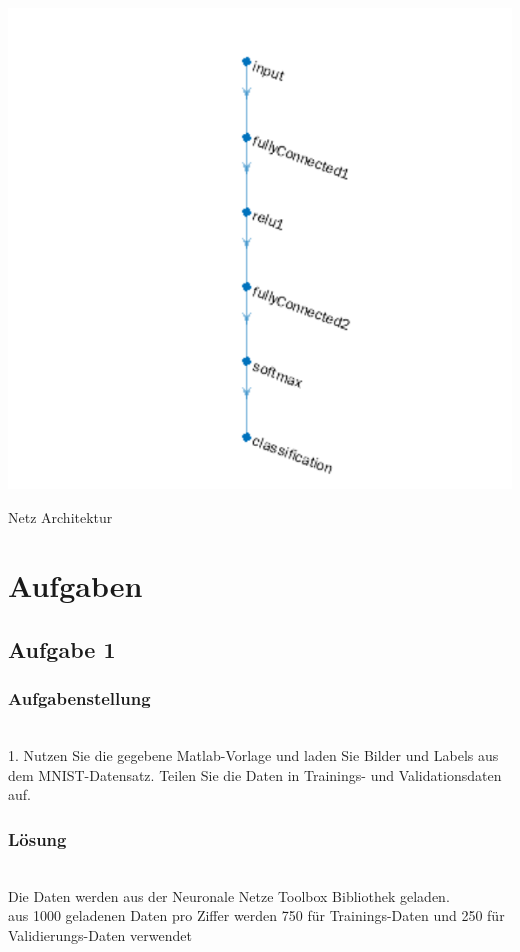 \documentclass[8pt,a4paper]{article}
\begin{document}
\begin{center}
    

    \includegraphics[scale = 0.4]{model.png}
    \caption{Netz Architektur}
\end{center}


\section{Aufgaben}
\subsection{Aufgabe 1}
\subsubsection{Aufgabenstellung}
\\
1. Nutzen Sie die gegebene Matlab-Vorlage und laden Sie Bilder und Labels aus dem MNIST-Datensatz. Teilen Sie die Daten in Trainings- und
Validationsdaten auf.
\\
\subsubsection{Lösung}
\\
Die Daten werden aus der Neuronale Netze Toolbox Bibliothek geladen.\\
aus 1000 geladenen Daten pro Ziffer werden 750 für Trainings-Daten und 250 für Validierungs-Daten verwendet
\end{document}

